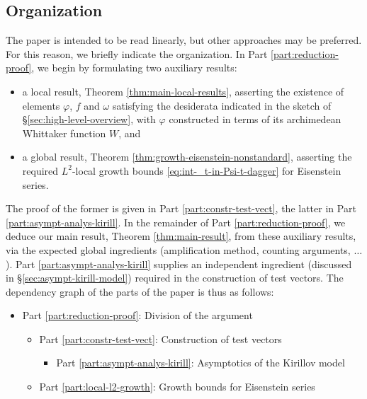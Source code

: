 \documentclass[reqno]{amsart}
\theoremstyle{plain} \newtheorem{theorem} {Theorem}
\theoremstyle{definition} \newtheorem{definition} [theorem] {Definition}
\theoremstyle{itplain} %
\numberwithin{equation}{section}
\numberwithin{theorem}{section}
\begin{document}
\subsection{Organization}
The paper is intended to be read linearly, but other approaches may be preferred.  For this reason, we briefly indicate the organization.  In Part \ref{part:reduction-proof}, we begin by formulating two auxiliary results:
\begin{itemize}
\item a local result, Theorem \ref{thm:main-local-results}, asserting the existence of elements $\varphi$, $f$ and $\omega$ satisfying the desiderata indicated in the sketch of  \S\ref{sec:high-level-overview}, with $\varphi$ constructed in terms of its archimedean Whittaker function $W$, and 
\item a global result, Theorem \ref{thm:growth-eisenstein-nonstandard}, asserting the required $L^2$-local growth bounds \eqref{eq:int-_t-in-Psi-t-dagger} for Eisenstein series.
\end{itemize}
The proof of the former is given in Part \ref{part:constr-test-vect}, the latter in Part \ref{part:asympt-analys-kirill}.  In the remainder of Part \ref{part:reduction-proof}, we deduce our main result, Theorem \ref{thm:main-result}, from these auxiliary results, via the expected global ingredients (amplification method, counting arguments, $\dotsc$).  Part \ref{part:asympt-analys-kirill} supplies an independent ingredient (discussed in \S\ref{sec:asympt-kirill-model}) required in the construction of test vectors.  The dependency graph of the parts of the paper is thus as follows:
\begin{itemize}
\item Part \ref{part:reduction-proof}: Division of the argument
  \begin{itemize}
  \item Part \ref{part:constr-test-vect}: Construction of test vectors
    \begin{itemize}
    \item Part \ref{part:asympt-analys-kirill}: Asymptotics of the Kirillov model
    \end{itemize}
  \item Part \ref{part:local-l2-growth}: Growth bounds for Eisenstein series
  \end{itemize}
\end{itemize}
\end{document}
